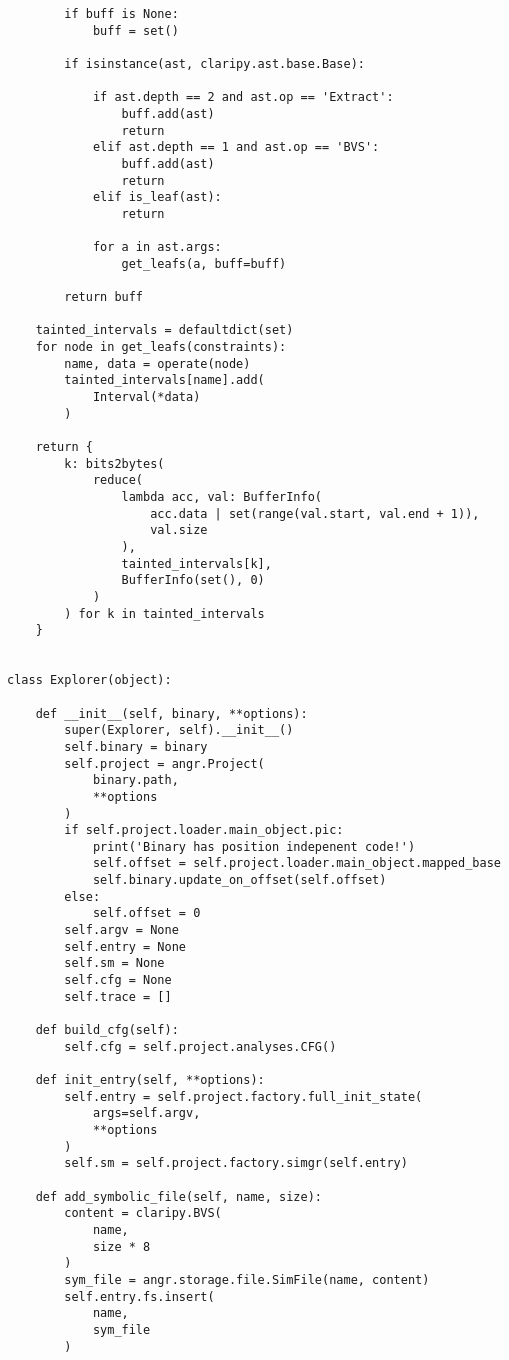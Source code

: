 \documentclass[a4paper,12pt]{report}
\begin{document}
\begin{lstlisting}
        if buff is None:
            buff = set()

        if isinstance(ast, claripy.ast.base.Base):

            if ast.depth == 2 and ast.op == 'Extract':
                buff.add(ast)
                return
            elif ast.depth == 1 and ast.op == 'BVS':
                buff.add(ast)
                return
            elif is_leaf(ast):
                return

            for a in ast.args:
                get_leafs(a, buff=buff)

        return buff

    tainted_intervals = defaultdict(set)
    for node in get_leafs(constraints):
        name, data = operate(node)
        tainted_intervals[name].add(
            Interval(*data)
        )

    return {
        k: bits2bytes(
            reduce(
                lambda acc, val: BufferInfo(
                    acc.data | set(range(val.start, val.end + 1)),
                    val.size
                ),
                tainted_intervals[k],
                BufferInfo(set(), 0)
            )
        ) for k in tainted_intervals
    }


class Explorer(object):

    def __init__(self, binary, **options):
        super(Explorer, self).__init__()
        self.binary = binary
        self.project = angr.Project(
            binary.path,
            **options
        )
        if self.project.loader.main_object.pic:
            print('Binary has position indepenent code!')
            self.offset = self.project.loader.main_object.mapped_base
            self.binary.update_on_offset(self.offset)
        else:
            self.offset = 0
        self.argv = None
        self.entry = None
        self.sm = None
        self.cfg = None
        self.trace = []

    def build_cfg(self):
        self.cfg = self.project.analyses.CFG()

    def init_entry(self, **options):
        self.entry = self.project.factory.full_init_state(
            args=self.argv,
            **options
        )
        self.sm = self.project.factory.simgr(self.entry)

    def add_symbolic_file(self, name, size):
        content = claripy.BVS(
            name,
            size * 8
        )
        sym_file = angr.storage.file.SimFile(name, content)
        self.entry.fs.insert(
            name,
            sym_file
        )


\end{lstlisting}
\end{document}

